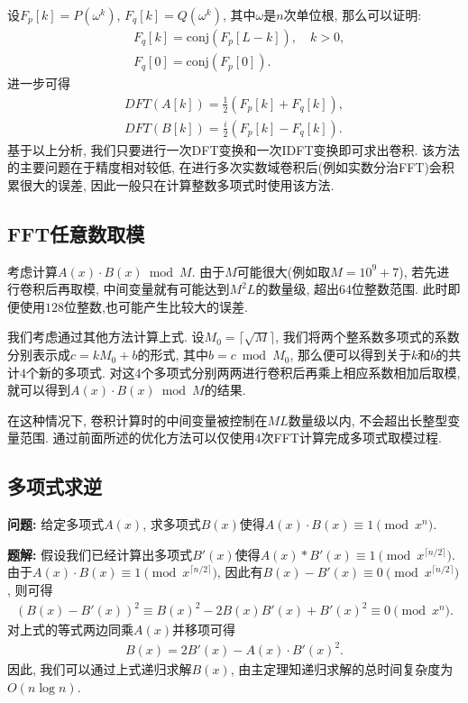 设$F_p[k] = P(\omega^k)$, $F_q[k]=Q(\omega^k)$, 其中$\omega$是$n$次单位根, 那么可以证明:
\begin{align*}
    & F_q[k] = \mathrm{conj}(F_p[L-k]), \quad k>0, \\
    & F_q[0] = \mathrm{conj}(F_p[0]).
\end{align*}
进一步可得
\begin{gather*}
    DFT(A[k]) = \frac{1}{2} (F_p[k] + F_q[k]), \\
    DFT(B[k]) = \frac{i}{2} (F_p[k] - F_q[k]).
\end{gather*}
基于以上分析, 我们只要进行一次DFT变换和一次IDFT变换即可求出卷积.
该方法的主要问题在于精度相对较低, 在进行多次实数域卷积后(例如实数分治FFT)会积累很大的误差, 因此一般只在计算整数多项式时使用该方法.



\subsection{FFT任意数取模}
考虑计算$A(x) \cdot B(x) \bmod M$.
由于$M$可能很大(例如取$M = 10^9 + 7$), 若先进行卷积后再取模, 中间变量就有可能达到$M^2 L$的数量级, 超出64位整数范围.
此时即便使用$128$位整数,也可能产生比较大的误差.

我们考虑通过其他方法计算上式.
设$M_0 = \lceil \sqrt{M} \rceil$, 我们将两个整系数多项式的系数分别表示成$c = k M_0 + b$的形式, 其中$b = c \bmod M_0$, 那么便可以得到关于$k$和$b$的共计$4$个新的多项式.
对这4个多项式分别两两进行卷积后再乘上相应系数相加后取模, 就可以得到$A(x) \cdot B(x) \bmod M$的结果.

在这种情况下, 卷积计算时的中间变量被控制在$M L$数量级以内, 不会超出⻓整型变量范围.
通过前面所述的优化方法可以仅使用$4$次FFT计算完成多项式取模过程.



\subsection{多项式求逆}
\textbf{问题:}
给定多项式$A(x)$, 求多项式$B(x)$使得$A(x) \cdot B(x) \equiv 1 \pmod{x^n}$.

\textbf{题解:}
假设我们已经计算出多项式$B' (x)$使得$A(x) * B'(x) \equiv 1 \pmod{x^{\lceil n/2 \rceil}}$.
由于$A(x) \cdot B(x) \equiv 1 \pmod{x^{\lceil n/2 \rceil}}$, 因此有$B(x) − B'(x) \equiv 0 \pmod{x^{\lceil n/2 \rceil}}$, 则可得
\begin{gather*}
    (B(x) − B'(x))^2 \equiv B(x)^2 − 2B(x)B'(x) + B'(x)^2 \equiv 0 \pmod{x^n}.
\end{gather*}
对上式的等式两边同乘$A(x)$并移项可得
\begin{gather*}
    B(x) = 2B'(x) − A(x) \cdot B'(x)^2.
\end{gather*}
因此, 我们可以通过上式递归求解$B(x)$, 由主定理知递归求解的总时间复杂度为$O(n \log n)$.

